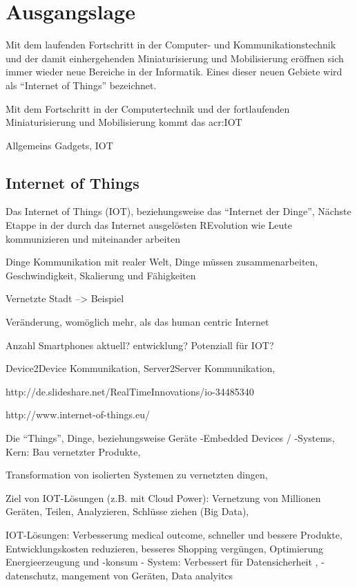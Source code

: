 \chapter{Ausgangslage}

Mit dem laufenden Fortschritt in der Computer- und Kommunikationstechnik und der damit einhergehenden Miniaturisierung und Mobilisierung eröffnen sich immer wieder neue Bereiche in der Informatik. Eines dieser neuen Gebiete wird als "`Internet of Things"' bezeichnet.

Mit dem Fortschritt in der Computertechnik und der fortlaufenden Miniaturisierung und Mobilisierung kommt das \gls{acr:IOT}

Allgemeins Gadgets, IOT



\section{Internet of Things}
Das Internet of Things (IOT), beziehungsweise das "`Internet der Dinge"', 
Nächste Etappe in der durch das Internet ausgelösten REvolution wie Leute kommunizieren und miteinander arbeiten

Dinge Kommunikation mit realer Welt, Dinge müssen zusammenarbeiten, Geschwindigkeit, Skalierung und Fähigkeiten

Vernetzte Stadt --> Beispiel

Veränderung, womöglich mehr, als das human centric Internet


Anzahl Smartphones aktuell? entwicklung?
Potenziall für IOT?

Device2Device Kommunikation, Server2Server Kommunikation, 

http://de.slideshare.net/RealTimeInnovations/io-34485340

http://www.internet-of-things.eu/


Die "`Things"', Dinge, beziehungsweise Geräte
-Embedded Devices / -Systems, Kern: Bau vernetzter Produkte, 

Transformation von isolierten Systemen zu vernetzten dingen, 

Ziel von IOT-Lösungen (z.B. mit Cloud Power): Vernetzung von Millionen Geräten, Teilen, Analyzieren, Schlüsse ziehen (Big Data), 

IOT-Lösungen: Verbesserung medical outcome, schneller und bessere Produkte, Entwicklungskosten reduzieren, besseres Shopping vergüngen, Optimierung Energieerzeugung und -konsum - System: Verbessert für Datensicherheit , -datenschutz, mangement von Geräten, Data analyitcs

